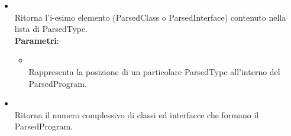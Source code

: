 \begin{itemize}
\begin{itemize}
\begin{itemize}
\end{itemize}
\item {}
\\ Ritorna l'i-esimo elemento (ParsedClass o ParsedInterface) contenuto nella lista di ParsedType.
\\ \textbf{Parametri}:
\begin{itemize}
\item {}
\\ Rappresenta la posizione di un particolare ParsedType all'interno del ParsedProgram.
\end{itemize}
\item {}
\\ Ritorna il numero complessivo di classi ed interfacce che formano il ParsedProgram.
\end{itemize}
\end{itemize}

